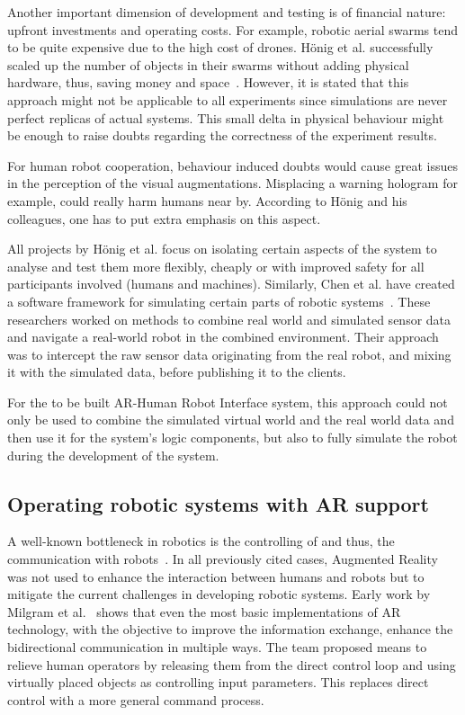 Another important dimension of development and testing is of financial nature: upfront investments and operating costs. For example, robotic aerial swarms tend to be quite expensive due to the high cost of drones. Hönig et al. successfully scaled up the number of objects in their swarms without adding physical hardware, thus, saving money and space~\cite{hoenig2015mixed}. However, it is stated that this approach might not be applicable to all experiments since simulations are never perfect replicas of actual systems. This small delta in physical behaviour might be enough to raise doubts regarding the correctness of the experiment results. 

For human robot cooperation, behaviour induced doubts would cause great issues in the perception of the visual augmentations. Misplacing a warning hologram for example, could really harm humans near by. According to Hönig and his colleagues, one has to put extra emphasis on this aspect. 

All projects by Hönig et al. focus on isolating certain aspects of the system to analyse and test them more flexibly, cheaply or with improved safety for all participants involved (humans and machines). Similarly, Chen et al. have created a software framework for simulating certain parts of robotic systems~\cite{chen2009mixed}. These researchers worked on methods to combine real world and simulated sensor data and navigate a real-world robot in the combined environment. Their approach was to intercept the raw sensor data originating from the real robot, and mixing it with the simulated data, before publishing it to the clients.

For the to be built AR-Human Robot Interface system, this approach could not only be used to combine the simulated virtual world and the real world data and then use it for the system's logic components, but also to fully simulate the robot during the development of the system. 

\subsection{Operating robotic systems with AR support}
A well-known bottleneck in robotics is the controlling of and thus, the communication with robots~\cite{RoboticsScienceMag}. In all previously cited cases, Augmented Reality was not used to enhance the interaction between humans and robots but to mitigate the current challenges in developing robotic systems. Early work by Milgram et al.~\cite{milgram1993applications} shows that even the most basic implementations of AR technology, with the objective to improve the information exchange, enhance the bidirectional communication in multiple ways. The team proposed means to relieve human operators by releasing them from the direct control loop and using virtually placed objects as controlling input parameters. This replaces direct control with a more general command process.

